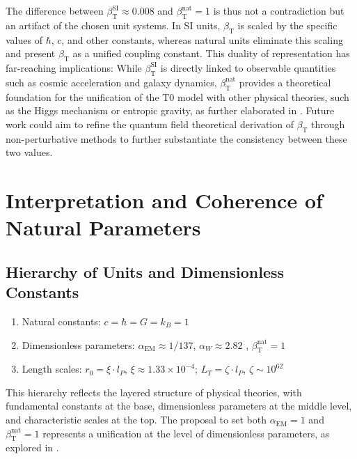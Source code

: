 \documentclass[12pt,a4paper]{article}
\newcommand{\alphaEM}{\alpha_{\text{EM}}}
\newcommand{\betaT}{\beta_{\text{T}}}
\begin{document}
	The difference between \(\betaT^{\text{SI}} \approx 0.008\) and \(\betaT^{\text{nat}} = 1\) is thus not a contradiction but an artifact of the chosen unit systems. In SI units, \(\betaT\) is scaled by the specific values of \(\hbar\), \(c\), and other constants, whereas natural units eliminate this scaling and present \(\betaT\) as a unified coupling constant. This duality of representation has far-reaching implications: While \(\betaT^{\text{SI}}\) is directly linked to observable quantities such as cosmic acceleration and galaxy dynamics, \(\betaT^{\text{nat}}\) provides a theoretical foundation for the unification of the T0 model with other physical theories, such as the Higgs mechanism or entropic gravity, as further elaborated in \cite{pascher_emergente_gravitation_2025}. Future work could aim to refine the quantum field theoretical derivation of \(\betaT\) through non-perturbative methods to further substantiate the consistency between these two values.
	
	\section{Interpretation and Coherence of Natural Parameters}
	\label{sec:interpretation}
	
	\subsection{Hierarchy of Units and Dimensionless Constants}
	\label{subsec:hierarchy_units}
	
	\begin{enumerate}
		\item Natural constants: \(c = \hbar = G = k_B = 1\)
		\item Dimensionless parameters: \(\alphaEM \approx 1/137\), \(\alpha_W \approx 2.82\) \cite{pascher_temp_2025}, \(\betaT^{\text{nat}} = 1\)
		\item Length scales: \(r_0 = \xi \cdot l_P\), \(\xi \approx 1.33 \times 10^{-4}\); \(L_T = \zeta \cdot l_P\), \(\zeta \sim 10^{62}\)
	\end{enumerate}
	
	This hierarchy reflects the layered structure of physical theories, with fundamental constants at the base, dimensionless parameters at the middle level, and characteristic scales at the top. The proposal to set both \(\alphaEM = 1\) and \(\betaT^{\text{nat}} = 1\) represents a unification at the level of dimensionless parameters, as explored in \cite{pascher_alphabeta_2025}.
	
\end{document}
